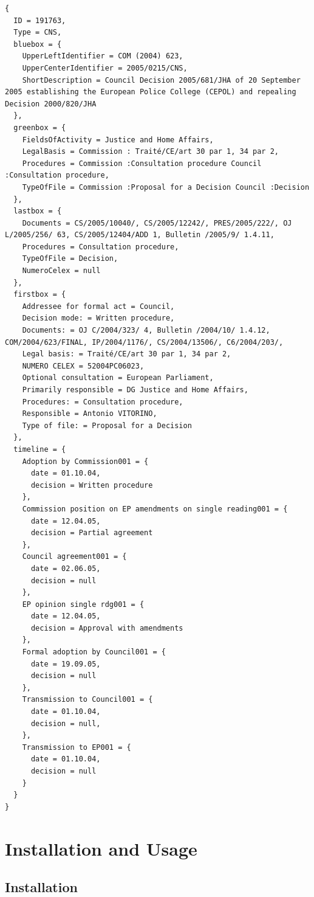 \documentclass{scrartcl}
\begin{document}
\begin{verbatim}
{
  ID = 191763,
  Type = CNS,
  bluebox = {
    UpperLeftIdentifier = COM (2004) 623,
    UpperCenterIdentifier = 2005/0215/CNS,
    ShortDescription = Council Decision 2005/681/JHA of 20 September 2005 establishing the European Police College (CEPOL) and repealing Decision 2000/820/JHA
  },
  greenbox = {
    FieldsOfActivity = Justice and Home Affairs,
    LegalBasis = Commission : Traité/CE/art 30 par 1, 34 par 2,
    Procedures = Commission :Consultation procedure Council :Consultation procedure,
    TypeOfFile = Commission :Proposal for a Decision Council :Decision
  },
  lastbox = {
    Documents = CS/2005/10040/, CS/2005/12242/, PRES/2005/222/, OJ L/2005/256/ 63, CS/2005/12404/ADD 1, Bulletin /2005/9/ 1.4.11,
    Procedures = Consultation procedure,
    TypeOfFile = Decision,
    NumeroCelex = null
  },
  firstbox = {
    Addressee for formal act = Council,
    Decision mode: = Written procedure,
    Documents: = OJ C/2004/323/ 4, Bulletin /2004/10/ 1.4.12, COM/2004/623/FINAL, IP/2004/1176/, CS/2004/13506/, C6/2004/203/,
    Legal basis: = Traité/CE/art 30 par 1, 34 par 2,
    NUMERO CELEX = 52004PC06023,
    Optional consultation = European Parliament,
    Primarily responsible = DG Justice and Home Affairs,
    Procedures: = Consultation procedure,
    Responsible = Antonio VITORINO,
    Type of file: = Proposal for a Decision
  },
  timeline = {
    Adoption by Commission001 = {
      date = 01.10.04,
      decision = Written procedure
    },
    Commission position on EP amendments on single reading001 = {
      date = 12.04.05,
      decision = Partial agreement
    },
    Council agreement001 = {
      date = 02.06.05,
      decision = null
    },
    EP opinion single rdg001 = {
      date = 12.04.05,
      decision = Approval with amendments
    },
    Formal adoption by Council001 = {
      date = 19.09.05,
      decision = null
    },
    Transmission to Council001 = {
      date = 01.10.04,
      decision = null,
    },
    Transmission to EP001 = {
      date = 01.10.04,
      decision = null
    }
  }
}
\end{verbatim}



\section{Installation and Usage}
\subsection{Installation}
\end{document}
